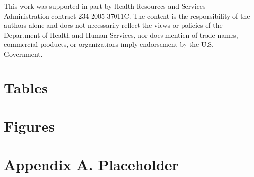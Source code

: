 \documentclass[12pt]{article}
\begin{document}
This work was supported in part by Health Resources and Services Administration contract 234-2005-37011C. The content is the responsibility of the authors alone and does not necessarily reflect the views or policies of the Department of Health and Human Services, nor does mention of trade names, commercial products, or organizations imply endorsement by the U.S. Government.

\clearpage





\clearpage


\section*{Tables} \label{sec:tab}



\clearpage

\section*{Figures} \label{sec:fig}




\clearpage

\section*{Appendix A. Placeholder} \label{sec:appendixa}
\end{document}
